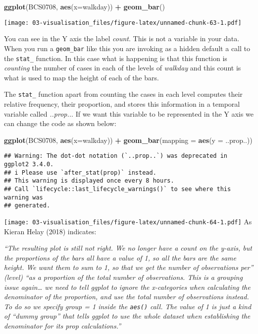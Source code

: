 \documentclass[
]{book}
\newenvironment{Shaded}{\begin{snugshade}}{\end{snugshade}}
\newcommand{\AttributeTok}[1]{\textcolor[rgb]{0.13,0.29,0.53}{#1}}
\newcommand{\FunctionTok}[1]{\textcolor[rgb]{0.13,0.29,0.53}{\textbf{#1}}}
\newcommand{\NormalTok}[1]{#1}
\newcommand{\SpecialCharTok}[1]{\textcolor[rgb]{0.81,0.36,0.00}{\textbf{#1}}}
\begin{document}
\begin{Shaded}
\begin{Highlighting}[]
\FunctionTok{ggplot}\NormalTok{(BCS0708, }\FunctionTok{aes}\NormalTok{(}\AttributeTok{x=}\NormalTok{walkday)) }\SpecialCharTok{+}
  \FunctionTok{geom\_bar}\NormalTok{()}
\end{Highlighting}
\end{Shaded}

\texttt{[image: 03-visualisation\_files/figure-latex/unnamed-chunk-63-1.pdf]}

You can see in the Y axis the label \emph{count}. This is not a variable in your data. When you run a \texttt{geom\_bar} like this you are invoking as a hidden default a call to the \texttt{stat\_} function. In this case what is happening is that this function is \emph{counting} the number of cases in each of the levels of \emph{walkday} and this count is what is used to map the height of each of the bars.

The \texttt{stat\_} function apart from counting the cases in each level computes their relative frequency, their proportion, and stores this information in a temporal variable called \emph{..prop..}. If we want this variable to be represented in the Y axis we can change the code as shown below:

\begin{Shaded}
\begin{Highlighting}[]
\FunctionTok{ggplot}\NormalTok{(BCS0708, }\FunctionTok{aes}\NormalTok{(}\AttributeTok{x=}\NormalTok{walkday)) }\SpecialCharTok{+}
  \FunctionTok{geom\_bar}\NormalTok{(}\AttributeTok{mapping =} \FunctionTok{aes}\NormalTok{(}\AttributeTok{y =}\NormalTok{ ..prop..))}
\end{Highlighting}
\end{Shaded}

\begin{verbatim}
## Warning: The dot-dot notation (`..prop..`) was deprecated in ggplot2 3.4.0.
## i Please use `after_stat(prop)` instead.
## This warning is displayed once every 8 hours.
## Call `lifecycle::last_lifecycle_warnings()` to see where this warning was
## generated.
\end{verbatim}

\texttt{[image: 03-visualisation\_files/figure-latex/unnamed-chunk-64-1.pdf]}
As Kieran Helay (2018) indicates:

\emph{``The resulting plot is still not right. We no longer have a count on the y-axis, but the proportions of the bars all have a value of 1, so all the bars are the same height. We want them to sum to 1, so that we get the number of observations per'' (level) ``as a proportion of the total number of observations. This is a grouping issue again\ldots{} we need to tell ggplot to ignore the x-categories when calculating the denominator of the proportion, and use the total number of observations instead. To do so we specify group = 1 inside the \texttt{aes()} call. The value of 1 is just a kind of ``dummy group'' that tells ggplot to use the whole dataset when establishing the denominator for its prop calculations.''}
\end{document}
